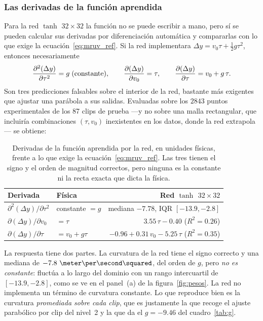 \documentclass[titlepage,11pt]{article}
\providecommand{\num}[1]{\ensuremath{#1}}
\begin{document}
\subsubsection{Las derivadas de la función aprendida}

Para la red $\tanh$ $32\times32$ la función no se puede escribir a mano, pero
sí se pueden calcular sus derivadas por diferenciación automática y compararlas
con lo que exige la ecuación~\eqref{eq:mruv_ref}. Si la red implementara
$\Delta y = v_0\tau + \tfrac{1}{2}g\tau^2$, entonces necesariamente
\begin{equation}
  \pdv[2]{(\Delta y)}{\tau} = g \;\text{(constante)}, \qquad
  \pdv{(\Delta y)}{v_0} = \tau, \qquad
  \pdv{(\Delta y)}{\tau} = v_0 + g\,\tau .
  \label{eq:predicciones_derivadas}
\end{equation}
Son tres predicciones falsables sobre el interior de la red, bastante más
exigentes que ajustar una parábola a sus salidas. Evaluadas sobre los
\num{2843} puntos experimentales de los 87 clips de prueba ---y no sobre una
malla rectangular, que incluiría combinaciones $(\tau,v_0)$ inexistentes en los
datos, donde la red extrapola--- se obtiene:

\begin{table}
  \centering
  \begin{tabular}{llr}
    \toprule
    Derivada & Física & Red $\tanh$ $32\times32$ \\
    \midrule
    $\partial^2(\Delta y)/\partial\tau^2$ & constante $=g$
      & mediana $-7.78$, IQR $[-13.9, -2.8]$ \\
    $\partial(\Delta y)/\partial v_0$ & $=\tau$
      & $3.55\,\tau - 0.40$ \quad ($R^2=0.26$) \\
    $\partial(\Delta y)/\partial\tau$ & $=v_0+g\tau$
      & $-0.96 + 0.31\,v_0 - 5.25\,\tau$ \quad ($R^2=0.35$) \\
    \bottomrule
  \end{tabular}
  \caption{Derivadas de la función aprendida por la red, en unidades físicas,
    frente a lo que exige la ecuación~\eqref{eq:mruv_ref}. Las tres tienen el
    signo y el orden de magnitud correctos, pero ninguna es la constante ni la
    recta exacta que dicta la física.}
  \label{tab:derivadas}
\end{table}

La respuesta tiene dos partes. La curvatura de la
red tiene el signo correcto y una mediana de
$\num{-7.8}~\meter\per\second\squared$, del orden de $g$, pero \emph{no es
constante}: fluctúa a lo largo del dominio con un rango intercuartil de
$[\num{-13.9},\num{-2.8}]$, como se ve en el panel~(a) de la
figura~\ref{fig:pesos}. La red no implementa un término de curvatura constante.
Lo que reproduce bien es la curvatura \emph{promediada sobre cada clip}, que es
justamente la que recoge el ajuste parabólico por clip del nivel~2 y la que da
el $g=\num{-9.46}$ del cuadro~\ref{tab:g}.
\end{document}

